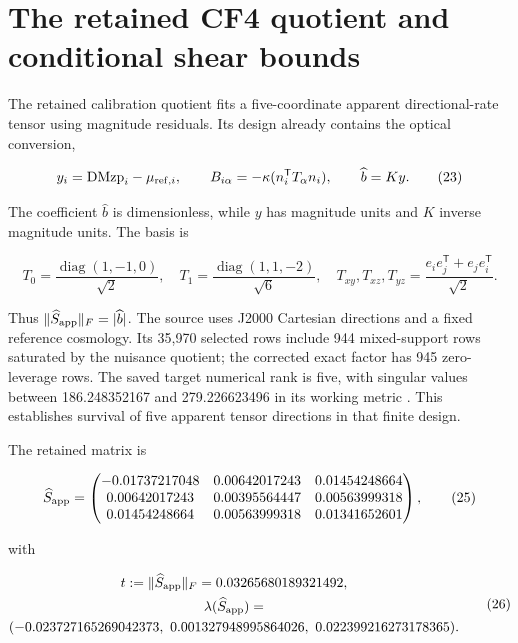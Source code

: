 \documentclass[aps,prd,reprint,onecolumn,11pt,nofootinbib,notitlepage]{revtex4-2}
\begin{document}
\section{The retained CF4 quotient and conditional shear bounds}

The retained calibration quotient fits a five-coordinate apparent directional-rate tensor using magnitude residuals. Its design already contains the optical conversion,

\begin{equation}
 y_i=\mathrm{DMzp}_i-\mu_{{\rm ref},i},\qquad
 B_{i\alpha}=-\kappa(n_i^{\mathsf T}T_\alpha n_i),\qquad
 \widehat b=Ky .\tag{23}
\end{equation}

The coefficient \(\widehat b\) is dimensionless, while \(y\) has magnitude units and \(K\) inverse magnitude units. The basis is

\begin{equation}
 T_0=\frac{\operatorname{diag}(1,-1,0)}{\sqrt2},\quad
 T_1=\frac{\operatorname{diag}(1,1,-2)}{\sqrt6},\quad
 T_{xy},T_{xz},T_{yz}=\frac{e_ie_j^{\mathsf T}+e_je_i^{\mathsf T}}{\sqrt2} .\tag{24}
\end{equation}

Thus \(\|\widehat S_{\rm app}\|_F=|\widehat b|\). The source uses J2000 Cartesian directions and a fixed reference cosmology. Its 35,970 selected rows include 944 mixed-support rows saturated by the nuisance quotient; the corrected exact factor has 945 zero-leverage rows. The saved target numerical rank is five, with singular values between 186.248352167 and 279.226623496 in its working metric \cite{CF4Retained}. This establishes survival of five apparent tensor directions in that finite design.

The retained matrix is

\begin{equation}
 \widehat S_{\rm app}=\begin{pmatrix}
 -0.01737217048&0.00642017243&0.01454248664\\
 0.00642017243&0.00395564447&0.00563999318\\
 0.01454248664&0.00563999318&0.01341652601
 \end{pmatrix},\tag{25}
\end{equation}

with

\begin{equation}
 \begin{gathered}t:=\|\widehat S_{\rm app}\|_F=0.03265680189321492,\\
 \lambda(\widehat S_{\rm app})=\\
 (-0.023727165269042373,\ 0.001327948995864026,\ 0.022399216273178365).\end{gathered}\tag{26}
\end{equation}
\end{document}
